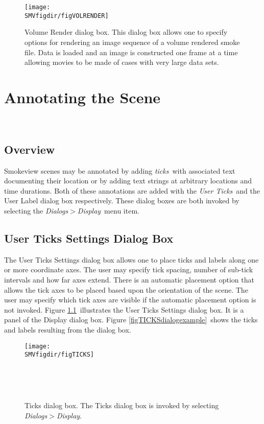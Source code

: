 \documentclass[11pt,twoside]{book}
\begin{document}
\begin{figure}[bph]
\centerline{
\texttt{[image: \\SMVfigdir/figVOLRENDER]}
}
\caption[Volume Render dialog box.]{Volume Render dialog box.
This dialog box allows one to specify
options for rendering an image sequence of a volume rendered smoke file. Data is loaded
and an image is constructed one frame at a time allowing movies to be made of cases
with very large data sets.
}
\label{figVOLRENDER}
\end{figure}

\chapter{Annotating the Scene }
\label{section:annotate}\ \label{subsect_features}
\section{Overview}
Smokeview scenes may be annotated by adding {\em ticks}\ with associated
text documenting their location
or by adding text strings at arbitrary locations and time durations.
Both of these annotations
are added with the {\em User Ticks}\ and the User Label dialog
box respectively.  These dialog boxes are both invoked by selecting the
{\em Dialogs$>$Display}\ menu item.

\section{User Ticks Settings Dialog Box}
The User Ticks Settings dialog box allows one to place
ticks and labels along one or more coordinate axes. The
user may specify tick spacing, number of sub-tick intervals and
how far axes extend.  There is an automatic placement option that
allows the tick axes to be placed based upon the orientation of
the scene.  The user may specify which tick axes are visible if
the automatic placement option is not invoked.  Figure
\ref{figTICKSdialog}\ illustrates the User Ticks Settings
dialog box.  It is a panel of the Display dialog box.
Figure \ref{figTICKSdialogexample}\ shows the ticks and labels
resulting from the dialog box.

\begin{figure}[bph]
\centerline{
\texttt{[image: \\SMVfigdir/figTICKS]}
}\ \caption[Ticks dialog box.]{Ticks dialog box. The
Ticks dialog box is invoked by selecting {\em
Dialogs$>$Display}. }\ \label{figTICKSdialog}
\end{figure}
\end{document}
